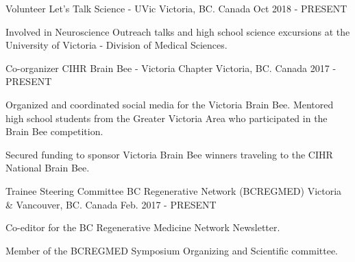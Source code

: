 

\begin{cventries}


  \cventry
    {Volunteer} %
    {Let's Talk Science - UVic} %
    {Victoria, BC. Canada} %
    {Oct 2018 - PRESENT} %
    {
      \begin{cvitems} %
        \item {Involved in Neuroscience Outreach talks and high school science excursions at the University of Victoria - Division of Medical Sciences.}
      \end{cvitems}
    }

  \cventry
    {Co-organizer} %
    {CIHR Brain Bee - Victoria Chapter} %
    {Victoria, BC. Canada} %
    {2017 - PRESENT} %
    {
      \begin{cvitems} %
        \item {Organized and coordinated social media for the Victoria Brain Bee. Mentored high school students from the Greater Victoria Area who participated in the Brain Bee competition.}
        \item {Secured funding to sponsor Victoria Brain Bee winners traveling to the CIHR National Brain Bee.}
      \end{cvitems}
    }
  \cventry
    {Trainee Steering Committee} %
    {BC Regenerative Network (BCREGMED)} %
    {Victoria \& Vancouver, BC. Canada} %
    {Feb. 2017 - PRESENT} %
    {
      \begin{cvitems} %
        \item {Co-editor for the BC Regenerative Medicine Network Newsletter.}
        \item {Member of the BCREGMED Symposium Organizing and Scientific committee.}
      \end{cvitems}
    }
  

\end{cventries}
